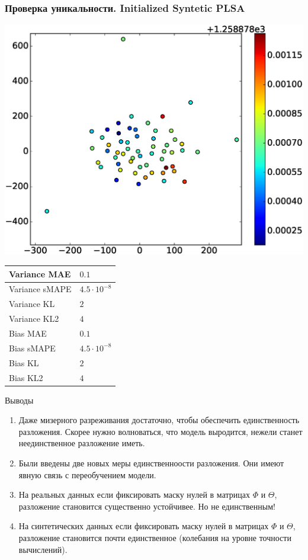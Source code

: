 \documentclass[utf8]{beamer}
\begin{document}
	
	\begin{frame}	
	\frametitle{Проверка уникальности. Initialized Syntetic PLSA}
	 \includegraphics[width=0.5\linewidth]{presentation_pictures/full_initialized_syntetic_plsa.eps} 
    \begin{tabular}[b]{| l | l | }\hline
      Variance MAE & $0.1$ \\ \hline
      Variance sMAPE  & $4.5 \cdot 10^{-8}$ \\ \hline
      Variance KL  & $2$ \\ \hline
      Variance KL2  & $4$ \\ \hline

      Bias MAE & $0.1$ \\ \hline
      Bias sMAPE  & $4.5 \cdot 10^{-8}$ \\ \hline
      Bias KL  & $2$ \\ \hline
      Bias KL2  & $4$ \\ \hline
    \end{tabular}

	\end{frame}
	
	

\begin{frame}{Выводы}
\begin{enumerate}
\item Даже мизерного разреживания достаточно, чтобы обеспечить единственность разложения. Скорее нужно волноваться, что модель выродится, нежели станет неединственное разложение иметь.
\item Были введены две новых меры единственноости разложения. Они имеют явную связь с переобучением модели.
\item На реальных данных если фиксировать маску нулей в матрицах $\Phi$ и $\Theta$, разложение становится существенно устойчивее. Но не единственным!
\item На синтетических данных если фиксировать маску нулей в матрицах $\Phi$ и $\Theta$, разложение становится  почти единственное (колебания на уровне точности вычислений).
\end{enumerate}
\end{frame}
\end{document}
